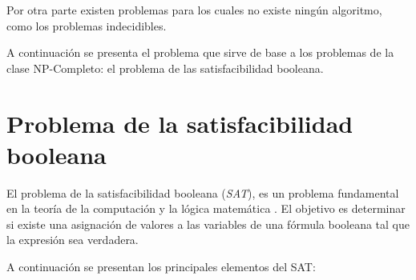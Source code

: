\documentclass[12pt]{article}
\begin{document}
Por otra parte existen problemas para los cuales no existe ningún algoritmo, como los problemas indecidibles.

A continuación se presenta el problema que sirve de base a los problemas de la clase NP-Completo: el problema de las satisfacibilidad
booleana.

\section{Problema de la satisfacibilidad booleana}

El problema de la satisfacibilidad booleana (\textit{SAT}), es un problema fundamental en la teoría de la 
computación y la lógica matemática \cite{authomataTheory}. El objetivo es determinar si existe una asignación 
de valores a las variables de una fórmula booleana tal que la expresión sea verdadera.

A continuación se presentan los principales elementos del SAT:
\end{document}
